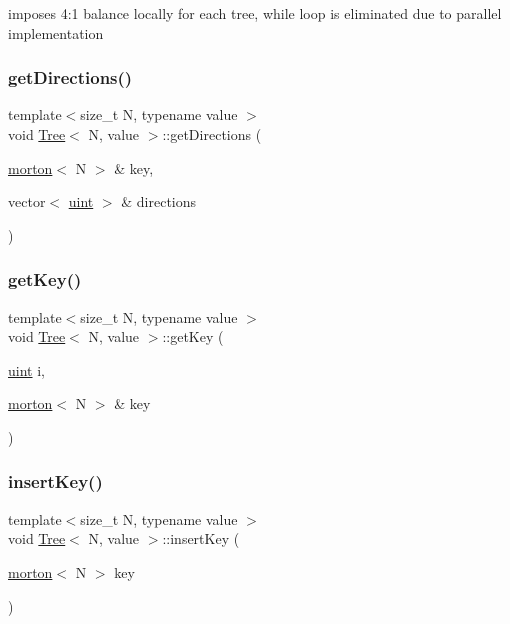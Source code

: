 imposes 4\+:1 balance locally for each tree, while loop is eliminated due to parallel implementation \mbox{\label{classTree_affd94b8b250ab921a02f987977c0b14c}} 
\subsubsection{\texorpdfstring{get\+Directions()}{getDirections()}}
{\footnotesize\ttfamily template$<$size\+\_\+t N, typename value $>$ \\
void \mbox{\hyperlink{classTree}{Tree}}$<$ N, value $>$\+::get\+Directions (\begin{DoxyParamCaption}\item[{\mbox{\hyperlink{definitions_8h_af8682350bd8bb38ee9023f7a0a310add}{morton}}$<$ N $>$ \&}]{key,  }\item[{vector$<$ \mbox{\hyperlink{definitions_8h_a69aa29b598b851b0640aa225a9e5d61d}{uint}} $>$ \&}]{directions }\end{DoxyParamCaption})}

\mbox{\label{classTree_a7c243257bc4cbe0cec0d5b1a2098782c}} 
\subsubsection{\texorpdfstring{get\+Key()}{getKey()}}
{\footnotesize\ttfamily template$<$size\+\_\+t N, typename value $>$ \\
void \mbox{\hyperlink{classTree}{Tree}}$<$ N, value $>$\+::get\+Key (\begin{DoxyParamCaption}\item[{\mbox{\hyperlink{definitions_8h_a69aa29b598b851b0640aa225a9e5d61d}{uint}}}]{i,  }\item[{\mbox{\hyperlink{definitions_8h_af8682350bd8bb38ee9023f7a0a310add}{morton}}$<$ N $>$ \&}]{key }\end{DoxyParamCaption})}

\mbox{\label{classTree_a5636d1c76405db54820d900909161987}} 
\subsubsection{\texorpdfstring{insert\+Key()}{insertKey()}}
{\footnotesize\ttfamily template$<$size\+\_\+t N, typename value $>$ \\
void \mbox{\hyperlink{classTree}{Tree}}$<$ N, value $>$\+::insert\+Key (\begin{DoxyParamCaption}\item[{\mbox{\hyperlink{definitions_8h_af8682350bd8bb38ee9023f7a0a310add}{morton}}$<$ N $>$}]{key }\end{DoxyParamCaption})}

